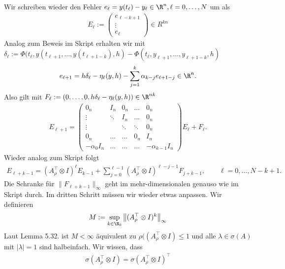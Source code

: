 \begin{solution}
Wir schreiben wieder den Fehler $e_{\ell} = y(t_{\ell}) - y_{\ell} \in \R^n, \ell = 0,\dots,N$ um als
\begin{align*}
  E_{\ell} := \begin{pmatrix}
    e_{\ell - k + 1} \\
    \vdots \\
    e_{\ell}
  \end{pmatrix}
  \in R^{kn}
\end{align*}
Analog zum Beweis im Skript erhalten wir mit
$\delta_{\ell} := \Phi(t_{\ell},y(t_{\ell + 1},\dots,y(t_{\ell+1-k}),h) -
\Phi(t_{\ell},y_{\ell + 1},\dots,y_{\ell+1-k},h)$
\begin{align*}
  e_{\ell + 1} = h\delta_{\ell} - \eta_{\ell}(y,h) - \sum_{j = 1}^k \alpha_{k - j}e_{\ell + 1 - j} \in \R^n.
\end{align*}
Also gilt mit $F_{\ell} := (0,\dots,0,h\delta_{\ell} - \eta_{\ell}(y,h)) \in \R^{nk}$
\begin{align*}
  E_{\ell + 1} = \begin{pmatrix}
    0_n & I_n & 0_n & \hdots & 0_n \\
    \vdots & \ddots & I_n & \hdots & 0_n\\
    \vdots &  & \ddots & \ddots & 0_n \\
    0_n & \hdots & \hdots & 0_n & I_n \\
    -\alpha_0I_n & \hdots & \hdots & \hdots & -\alpha_{k-1}I_n
  \end{pmatrix}E_{\ell} + F_{\ell}.
\end{align*}
Wieder analog zum Skript folgt
\begin{align*}
  E_{\ell + k - 1} =  \left(A_{\rho}^{\top} \otimes I\right)^{\ell}E_{k-1}
  + \sum_{j = 0}^{\ell - 1}\left(A_{\rho}^{\top} \otimes I\right)^{\ell - j - 1}F_{j + k - 1},
  \qquad \ell = 0,\dots,N-k+1.
\end{align*}
Die Schranke für $\|F_{\ell + k - 1}\|_{\infty}$ geht im mehr-dimensionalen
genauso wie im Skript durch.
Im dritten Schritt müssen wir wieder etwas anpassen. Wir definieren
\begin{align*}
  M := \sup_{k \in \N_0} \left\| (A_{\rho}^{\top} \otimes I)^k\right\|_{\infty}
\end{align*}
Laut Lemma 5.32. ist $M < \infty$ äquivalent zu $\rho((A_{\rho}^{\top} \otimes I) \leq 1$
und alle $\lambda \in \sigma(A)$ mit $|\lambda| = 1$ sind halbeinfach.
Wir wissen, dass
\begin{align*}
  \sigma(A_{\rho}^{\top} \otimes I) = \sigma(A_{\rho}^{\top} \otimes I)^{\top}

\end{align*}
\end{solution}
